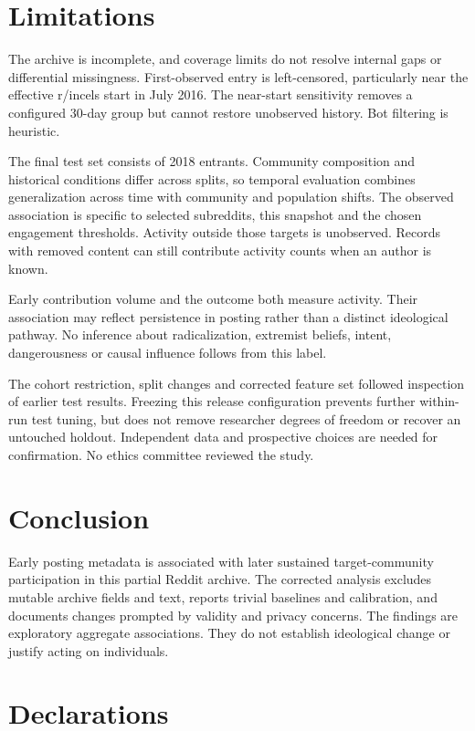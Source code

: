 \documentclass[10pt,twocolumn]{article}
\begin{document}
\section{Limitations}
The archive is incomplete, and coverage limits do not resolve internal gaps or differential missingness. First-observed entry is left-censored, particularly near the effective r/incels start in July 2016. The near-start sensitivity removes a configured 30-day group but cannot restore unobserved history. Bot filtering is heuristic.

The final test set consists of 2018 entrants. Community composition and historical conditions differ across splits, so temporal evaluation combines generalization across time with community and population shifts. The observed association is specific to selected subreddits, this snapshot and the chosen engagement thresholds. Activity outside those targets is unobserved. Records with removed content can still contribute activity counts when an author is known.

Early contribution volume and the outcome both measure activity. Their association may reflect persistence in posting rather than a distinct ideological pathway. No inference about radicalization, extremist beliefs, intent, dangerousness or causal influence follows from this label.

The cohort restriction, split changes and corrected feature set followed inspection of earlier test results. Freezing this release configuration prevents further within-run test tuning, but does not remove researcher degrees of freedom or recover an untouched holdout. Independent data and prospective choices are needed for confirmation. No ethics committee reviewed the study.

\section{Conclusion}
Early posting metadata is associated with later sustained target-community participation in this partial Reddit archive. The corrected analysis excludes mutable archive fields and text, reports trivial baselines and calibration, and documents changes prompted by validity and privacy concerns. The findings are exploratory aggregate associations. They do not establish ideological change or justify acting on individuals.

\section*{Declarations}
\end{document}

